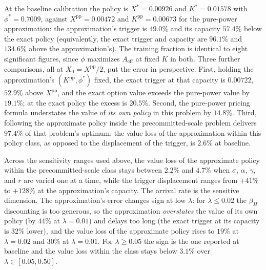 \documentclass[
  11pt,
  letterpaper,
]{scrartcl}
\begin{document}
At the baseline calibration the policy is \(X^* = 0.00926\) and
\(K^* = 0.01578\) with \(\phi^* = 0.7009\), against
\(X^{\text{pp}} = 0.00472\) and \(K^{\text{pp}} = 0.00673\) for the
pure-power approximation: the approximation's trigger is \(49.0\%\) and
its capacity \(57.4\%\) below the exact policy (equivalently, the exact
trigger and capacity are \(96.1\%\) and \(134.6\%\) above the
approximation's). The training fraction is identical to eight
significant figures, since \(\phi\) maximizes \(A_{\text{eff}}\) at
fixed \(K\) in both. Three further comparisons, all at
\(X_0 = X^{\text{pp}}/2\), put the error in perspective. First, holding
the approximation's \((K^{\text{pp}}, \phi^*)\) fixed, the exact trigger
at that capacity is \(0.00722\), \(52.9\%\) above \(X^{\text{pp}}\), and
the exact option value exceeds the pure-power value by \(19.1\%\); at
the exact policy the excess is \(20.5\%\). Second, the pure-power
pricing formula understates the value of \emph{its own policy} in this
problem by \(14.8\%\). Third, following the approximate policy inside
the precommitted-scale problem delivers \(97.4\%\) of that problem's
optimum: the value loss of the approximation within this policy class,
as opposed to the displacement of the trigger, is \(2.6\%\) at baseline.

Across the sensitivity ranges used above, the value loss of the
approximate policy within the precommitted-scale class stays between
\(2.2\%\) and \(4.7\%\) when \(\sigma\), \(\alpha\), \(\gamma\), and
\(r\) are varied one at a time, while the trigger displacement ranges
from \(+41\%\) to \(+128\%\) at the approximation's capacity. The
arrival rate is the sensitive dimension. The approximation's error
changes sign at low \(\lambda\): for \(\lambda \leq 0.02\) the
\(\beta_H\) discounting is too generous, so the approximation
\emph{overstates} the value of its own policy (by \(44\%\) at
\(\lambda = 0.01\)) and delays too long (the exact trigger at its
capacity is \(32\%\) lower), and the value loss of the approximate
policy rises to \(19\%\) at \(\lambda = 0.02\) and \(30\%\) at
\(\lambda = 0.01\). For \(\lambda \geq 0.05\) the sign is the one
reported at baseline and the value loss within the class stays below
\(3.1\%\) over \(\lambda \in [0.05, 0.50]\).
\end{document}
